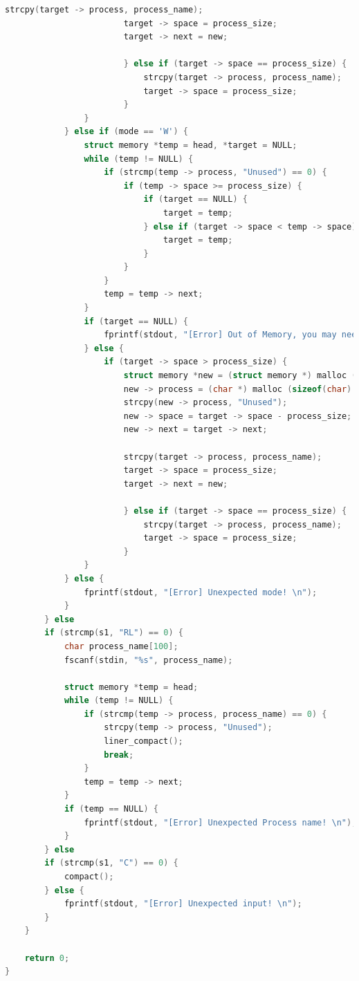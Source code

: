 \documentclass[UTF8,10pt,a4paper]{article}
\theoremstyle{Problem}
\theoremstyle{Solution}
\begin{document}
\begin{lstlisting}[language = c ]
                        strcpy(target -> process, process_name);
                        target -> space = process_size;
                        target -> next = new;

                        } else if (target -> space == process_size) {
                            strcpy(target -> process, process_name);
                            target -> space = process_size;
                        }
                }
            } else if (mode == 'W') {
                struct memory *temp = head, *target = NULL;
                while (temp != NULL) {
                    if (strcmp(temp -> process, "Unused") == 0) {
                        if (temp -> space >= process_size) {
                            if (target == NULL) {
                                target = temp;
                            } else if (target -> space < temp -> space) {
                                target = temp;
                            }
                        }
                    }
                    temp = temp -> next;
                }
                if (target == NULL) {
                    fprintf(stdout, "[Error] Out of Memory, you may need to compact!! \n");
                } else {
                    if (target -> space > process_size) {
                        struct memory *new = (struct memory *) malloc (sizeof(struct memory));
                        new -> process = (char *) malloc (sizeof(char) * 20);
                        strcpy(new -> process, "Unused");
                        new -> space = target -> space - process_size;
                        new -> next = target -> next;

                        strcpy(target -> process, process_name);
                        target -> space = process_size;
                        target -> next = new;

                        } else if (target -> space == process_size) {
                            strcpy(target -> process, process_name);
                            target -> space = process_size;
                        }
                }
            } else {
                fprintf(stdout, "[Error] Unexpected mode! \n");
            }
        } else
        if (strcmp(s1, "RL") == 0) {
            char process_name[100];
            fscanf(stdin, "%s", process_name);

            struct memory *temp = head;
            while (temp != NULL) {
                if (strcmp(temp -> process, process_name) == 0) {
                    strcpy(temp -> process, "Unused");
                    liner_compact();
                    break;
                }
                temp = temp -> next;
            }
            if (temp == NULL) {
                fprintf(stdout, "[Error] Unexpected Process name! \n");
            }
        } else
        if (strcmp(s1, "C") == 0) {
            compact();
        } else {
            fprintf(stdout, "[Error] Unexpected input! \n");
        }
    }

    return 0;
}
\end{lstlisting}
\end{document}
